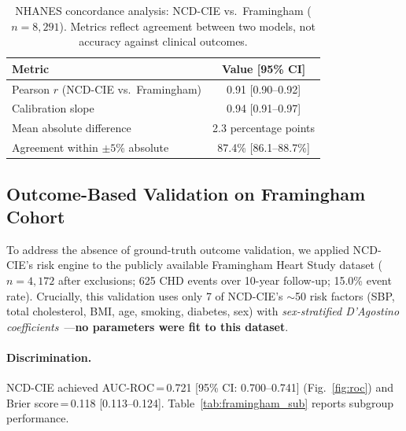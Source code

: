 \documentclass[runningheads]{llncs}
\begin{document}
\begin{table}[t]
\centering
\caption{NHANES concordance analysis: NCD-CIE vs.\ Framingham
($n = 8{,}291$).  Metrics reflect agreement between two models,
not accuracy against clinical outcomes.}
\label{tab:nhanes}
\small
\begin{tabular}{@{}lc@{}}
\toprule
\textbf{Metric} & \textbf{Value [95\% CI]} \\
\midrule
Pearson $r$ (NCD-CIE vs.\ Framingham) & 0.91 [0.90--0.92] \\
Calibration slope                       & 0.94 [0.91--0.97] \\
Mean absolute difference                & 2.3 percentage points \\
Agreement within $\pm 5$\% absolute     & 87.4\% [86.1--88.7\%] \\
\bottomrule
\end{tabular}
\end{table}

\subsection{Outcome-Based Validation on Framingham Cohort}\label{sec:framingham}

To address the absence of ground-truth outcome validation, we applied
NCD-CIE's risk engine to the publicly available Framingham Heart Study
dataset ($n = 4{,}172$ after exclusions; 625 CHD events over 10-year
follow-up; 15.0\% event rate).  Crucially, this validation uses only
7 of NCD-CIE's ${\sim}$50 risk factors (SBP, total cholesterol, BMI,
age, smoking, diabetes, sex) with \emph{sex-stratified D'Agostino
coefficients}~\cite{dagostino2008}---\textbf{no parameters were fit
to this dataset}.

\paragraph{Discrimination.}
NCD-CIE achieved AUC-ROC\,=\,0.721 [95\% CI: 0.700--0.741]
(Fig.~\ref{fig:roc}) and
Brier score\,=\,0.118 [0.113--0.124].  Table~\ref{tab:framingham_sub}
reports subgroup performance.
\end{document}
